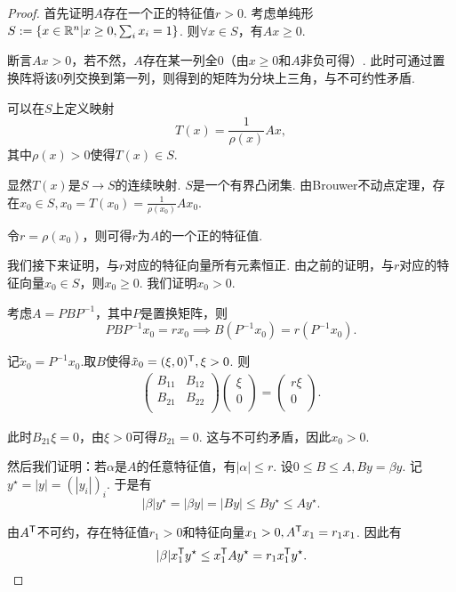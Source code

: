 \begin{proof}
首先证明$A$存在一个正的特征值$r>0$. 考虑单纯形$S:=\{x\in\mathbb{R}^n|x\ge 0,\sum_i x_i=1\}$. 则$\forall x\in S$，有$Ax\ge 0$. 

断言$Ax>0$，若不然，$A$存在某一列全$0$（由$x\ge 0$和$A$非负可得）. 此时可通过置换阵将该$0$列交换到第一列，则得到的矩阵为分块上三角，与不可约性矛盾.

可以在$S$上定义映射
\[T(x) = \frac1{\rho(x)}Ax,\]
其中$\rho(x) > 0$使得$T(x)\in S$.

显然$T(x)$是$S\to S$的连续映射. $S$是一个有界凸闭集. 由Brouwer不动点定理，存在$x_0\in S, x_0 = T(x_0)=\frac1{\rho(x_0)}Ax_0$.

令$r=\rho(x_0)$，则可得$r$为$A$的一个正的特征值.

我们接下来证明，与$r$对应的特征向量所有元素恒正. 由之前的证明，与$r$对应的特征向量$x_0\in S$，则$x_0\ge 0$. 我们证明$x_0>0$.

考虑$A = PBP^{-1}$，其中$P$是置换矩阵，则
\[PBP^{-1}x_0=rx_0\implies B(P^{-1}x_0)=r(P^{-1}x_0).\]

记$\tilde{x}_0 = P^{-1}x_0$.取$B$使得$\tilde{x}_0 = (\xi,0)^{\mathsf{T}}, \xi > 0$. 则
\begin{align*}
    \left(                 %
        \begin{array}{cc}   
        B_{11} & B_{12}\\  
        B_{21} & B_{22}\\  
        \end{array}
    \right)
    \left(                 
        \begin{array}{c}   
        \xi\\  %
        0\\
        \end{array}
    \right)=
    \left(                 
        \begin{array}{c}   
        r\xi\\  %
        0\\
        \end{array}
    \right).
\end{align*}

此时$B_{21}\xi=0$，由$\xi>0$可得$B_{21}=0$. 这与不可约矛盾，因此$x_0 > 0$.

然后我们证明：若$\alpha$是$A$的任意特征值，有$|\alpha|\le r$. 设$0\le B\le A, By=\beta y$. 记$y^\star = |y|=(|y_i|)_i$. 于是有
\[|\beta|y^\star = |\beta y| = |By| \le By^\star\le Ay^\star.\]

由$A^{\mathsf{T}}$不可约，存在特征值$r_1>0$和特征向量$x_1>0, A^{\mathsf{T}} x_1 = r_1x_1$. 因此有
\[|\beta|x_1^{\mathsf{T}} y^\star \le x_1^{\mathsf{T}} Ay^\star = r_1x_1^{\mathsf{T}} y^\star.\]


\end{proof}

